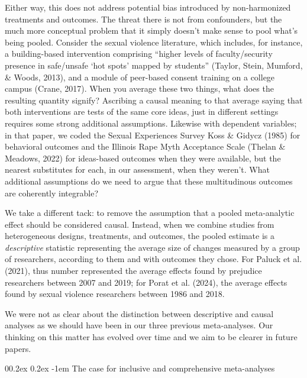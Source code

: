 \documentclass[
  man]{apa6}
\makeatletter
\let\oldparagraph\paragraph
\renewcommand{\paragraph}[1]{\oldparagraph{#1}\mbox{}}
\renewcommand{\paragraph}{\@startsection{paragraph}{4}{\parindent}%
  {0\baselineskip \@plus 0.2ex \@minus 0.2ex}%
  {-1em}%
  {\normalfont\normalsize\bfseries\itshape\typesectitle}}
\makeatother
\begin{document}
Either way, this does not address potential bias introduced by non-harmonized treatments and outcomes. The threat there is not from confounders, but the much more conceptual problem that it simply doesn't make sense to pool what's being pooled. Consider the sexual violence literature, which includes, for instance, a building-based intervention comprising ``higher levels of faculty/security presence in safe/unsafe `hot spots' mapped by students'' (Taylor, Stein, Mumford, \& Woods, 2013), and a module of peer-based consent training on a college campus (Crane, 2017). When you average these two things, what does the resulting quantity signify? Ascribing a causal meaning to that average \textemdash saying that both interventions are tests of the same core ideas, just in different settings \textemdash requires some strong additional assumptions. Likewise with dependent variables; in that paper, we coded the Sexual Experiences Survey Koss \& Gidycz (1985) for behavioral outcomes and the Illinois Rape Myth Acceptance Scale (Thelan \& Meadows, 2022) for ideas-based outcomes when they were available, but the nearest substitutes for each, in our assessment, when they weren't. What additional assumptions do we need to argue that these multitudinous outcomes are coherently integrable?

We take a different tack: to remove the assumption that a pooled meta-analytic effect should be considered causal. Instead, when we combine studies from heterogeneous designs, treatments, and outcomes, the pooled estimate is a \emph{descriptive} statistic representing the average size of changes measured by a group of researchers, according to them and with outcomes they chose. For Paluck et al. (2021), thus number represented the average effects found by prejudice researchers between 2007 and 2019; for Porat et al. (2024), the average effects found by sexual violence researchers between 1986 and 2018.

We were not as clear about the distinction between descriptive and causal analyses as we should have been in our three previous meta-analyses. Our thinking on this matter has evolved over time and we aim to be clearer in future papers.

\paragraph{The case for inclusive and comprehensive meta-analyses}\label{the-case-for-inclusive-and-comprehensive-meta-analyses}
\end{document}

